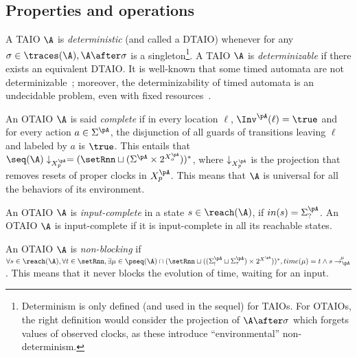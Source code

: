 \documentclass{LMCS}
\theoremstyle{plain}\newtheorem{proposition}[thm]{Proposition}
\begin{document}
\subsection{Properties and operations}
A TAIO $\A$ is {\em deterministic} (and called a DTAIO) whenever for
any $\sigma \in \traces(\A), \A \after \sigma$ is a
singleton\footnote{Determinism is only defined (and used in the
  sequel) for TAIOs.  For OTAIOs, the right definition would consider
  the projection of $\A \after \sigma$ which forgets values of
  observed clocks, as these introduce ``environmental''
  non-determinism.}.  A TAIO $\A$ is {\it determinizable} if there
exists an equivalent DTAIO.  It is well-known that some timed automata
are not determinizable~\cite{AlurDill94}; moreover, the
determinizability of timed automata is an undecidable problem, even
with fixed resources~\cite{Tripakis-ipl06,Finkel-formats06}.

 



An OTAIO $\A$ is said {\em complete} if in every location $\ell$,
$\Inv^\pA(\ell)= \true$ and for every action $a\in \Sigma^\pA$, the
disjunction of all guards of transitions leaving $\ell$ and labeled
by $a$ is $\true$.  
This entails that 
$\seq(\A)\downarrow_{X^\pA_p} = (\setRnn \sqcup (\Sigma^\pA \times 2^{X_o^\pA}))^*$,
where $\downarrow_{X^\pA_p}$ is the projection 
that removes resets of proper clocks in $X^\pA_p$.
This means that $\A$ is universal for all the behaviors of its environment.


An OTAIO $\A$ is {\em input-complete} in a state $s \in \reach(\A)$, if
 $in(s) = \Sigma_?^\pA$.  
An OTAIO $\A$  is input-complete if it is input-complete in all its
reachable states.

An OTAIO
$\A$ is {\em non-blocking} if $\forall s \in \reach(\A), \forall t \in
\setRnn, \exists \mu \in \pseq(\A) \cap (\setRnn \sqcup ((\Sigma_!^\pA
\sqcup \Sigma_\tau^\pA) \times 2^{X^\pA}))^*, time(\mu) = t \wedge s
\stackrel{\mu}{\rightarrow_\pA}$.
This means that it never  blocks the evolution of time, waiting for an input.
\end{document}
